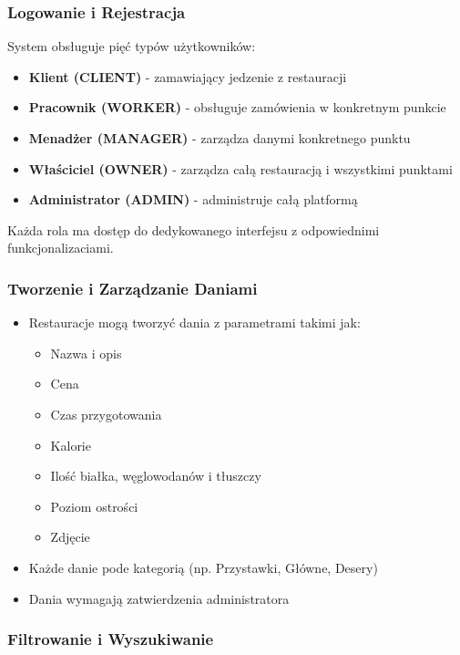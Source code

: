 \documentclass[12pt,a4paper,utf-8]{article}
\begin{document}
\subsubsection{Logowanie i Rejestracja}

System obsługuje pięć typów użytkowników:
\begin{itemize}
    \item \textbf{Klient (CLIENT)} - zamawiający jedzenie z restauracji
    \item \textbf{Pracownik (WORKER)} - obsługuje zamówienia w konkretnym punkcie
    \item \textbf{Menadżer (MANAGER)} - zarządza danymi konkretnego punktu
    \item \textbf{Właściciel (OWNER)} - zarządza całą restauracją i wszystkimi punktami
    \item \textbf{Administrator (ADMIN)} - administruje całą platformą
\end{itemize}

Każda rola ma dostęp do dedykowanego interfejsu z odpowiednimi funkcjonalizaciami.

\subsubsection{Tworzenie i Zarządzanie Daniami}

\begin{itemize}
    \item Restauracje mogą tworzyć dania z parametrami takimi jak:
    \begin{itemize}
        \item Nazwa i opis
        \item Cena
        \item Czas przygotowania
        \item Kalorie
        \item Ilość białka, węglowodanów i tłuszczy
        \item Poziom ostrości
        \item Zdjęcie
    \end{itemize}
    \item Każde danie pode kategorią (np. Przystawki, Główne, Desery)
    \item Dania wymagają zatwierdzenia administratora
\end{itemize}

\subsubsection{Filtrowanie i Wyszukiwanie}
\end{document}
